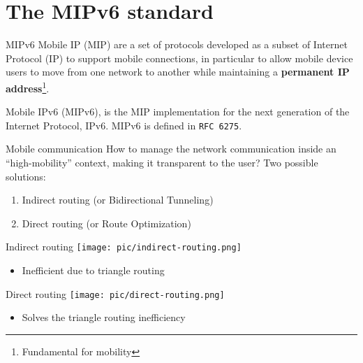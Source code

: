 \documentclass[10pt]{beamer}
\begin{document}
\section{The MIPv6 standard}
\begin{frame}{MIPv6}
	Mobile IP (MIP) are a set of protocols developed as a subset of Internet Protocol (IP) to support mobile connections, in particular \alert{to allow mobile device users to move from one network to another while maintaining a \textbf{permanent IP address}}\footnote{Fundamental for mobility}. \par
	Mobile IPv6 (MIPv6), is the MIP implementation for the next generation of the Internet Protocol, IPv6. MIPv6 is defined in \texttt{RFC 6275}. 
\end{frame}
\begin{frame}{Mobile communication}
	How to manage the network communication inside an ``high-mobility'' context, making it transparent to the user? Two possible solutions:
	\begin{enumerate}
		\item Indirect routing (or \alert{Bidirectional Tunneling})
		\item Direct routing (or \alert{Route Optimization})
	\end{enumerate}
\end{frame}

\begin{frame}{Indirect routing}
	\centering
	\texttt{[image: pic/indirect-routing.png]}
	\vspace{-0.3cm}
	\begin{itemize}
		\item Inefficient due to \alert{triangle routing} %
	\end{itemize}
\end{frame}

\begin{frame}{Direct routing}
	\centering
	\texttt{[image: pic/direct-routing.png]}
	\vspace{-0.3cm}
	\begin{itemize}
		\item Solves the triangle routing inefficiency
	\end{itemize}
\end{frame}
\end{document}
